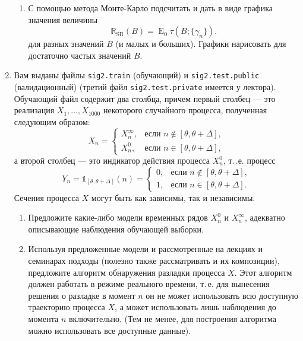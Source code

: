 \documentclass[a4paper,14pt]{extreport}
\renewcommand{\=}[1]{\stackrel{#1}{=}} %
\newcommand{\Expect}{\mathop{{}\mathrm{E}}}
\begin{document}
\begin{enumerate}
\begin{enumerate}
        \item С помощью метода Монте-Карло подсчитать
        и дать в виде графика значения величины
        \[
        \mathbb{R}_{\text{SR}}(B) = 
        {\textstyle \Expect_{0}} \tau(B; \{\gamma_n\}).
        \]
        для разных значений $B$ (и малых и больших). Графики нарисовать для достаточно
        частых значений $B$.

    \end{enumerate}

    \item Вам выданы файлы \texttt{sig2.train}
    (обучающий) и \texttt{sig2.test.public}
    (валидационный) (третий файл
    \texttt{sig2.test.private} имеется у лектора). 
    Обучающий файл содержит два столбца, причем
    первый столбец --- это реализация 
    $X_1, \ldots, X_{1000}$ некоторого
    случайного процесса, полученная следующим
    образом:
    \[
    X_n = 
    \begin{cases}
        X^{\infty}_n, & \text{если } n \notin [\theta, \theta + \Delta], \\
        X^{0}_n, & \text{если } n \in [\theta, \theta + \Delta],
    \end{cases}
    \]
    а второй столбец --- это индикатор действия
    процесса $X^{0}_n$, т.\,.е. процесс
    \[
    Y_n = \mathds{1}_{[\theta, \theta + \Delta]}(n) = 
    \begin{cases}
        0, & \text{если } n \notin [\theta, \theta + \Delta], \\
        1, & \text{если } n \in [\theta, \theta + \Delta].
    \end{cases}
    \]
    Сечения процесса $X$ могут быть как зависимы,
    так и независимы.

    \begin{enumerate}
        \item Предложите какие-либо
        модели временных рядов
        $X^{0}_n$ и $X^{\infty}_n$, 
        адекватно описывающие наблюдения
        обучающей выборки.

        \item Используя предложенные модели
        и рассмотренные на лекциях и семинарах
        подходы (полезно также рассматривать
        и их композиции), 
        предложите алгоритм обнаружения разладки
        процесса $X$. Этот алгоритм должен работать
        в режиме реального времени, т.\,е. для вынесения
        решения о разладке в момент $n$
        он не может использовать 
        всю доступную траекторию процесса
        $X$, а может использовать  лишь наблюдения
        до момента $n$ включительно.
        (Тем не менее, для построения алгоритма
        можно использовать все доступные данные).


\end{enumerate}
\end{enumerate}
\end{document}
